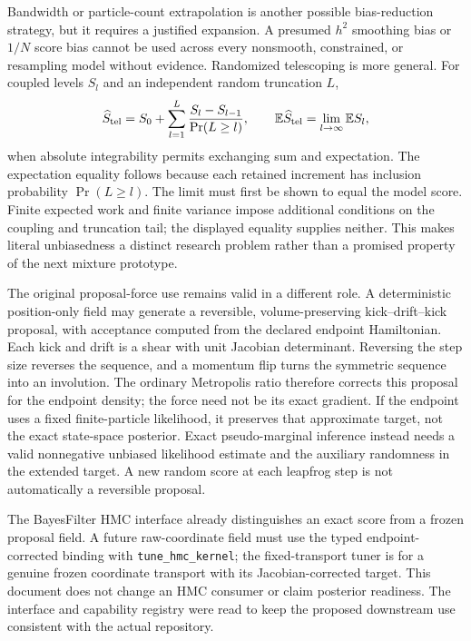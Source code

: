\documentclass[11pt]{article}
\begin{document}
Bandwidth or particle-count extrapolation is another possible bias-reduction
strategy, but it requires a justified expansion. A presumed $h^2$ smoothing
bias or $1/N$ score bias cannot be used across every nonsmooth, constrained,
or resampling model without evidence. Randomized telescoping is more general.
For coupled levels $S_l$ and an independent random truncation $L$,
\begin{equation}
 \widehat S_{\rm tel}
 =S_0+\sum_{l=1}^{L}\frac{S_l-S_{l-1}}{\Pr(L\ge l)},
 \qquad
 \mathbb E\widehat S_{\rm tel}=\lim_{l\to\infty}\mathbb E S_l,
 \label{eq:randomized-telescope}
\end{equation}
when absolute integrability permits exchanging sum and expectation. The
expectation equality follows because each retained increment has inclusion
probability $\Pr(L\ge l)$. The limit must first be shown to equal the model
score. Finite expected work and finite variance impose additional conditions
on the coupling and truncation tail; the displayed equality supplies neither.
This makes literal unbiasedness a distinct research problem rather than a
promised property of the next mixture prototype.

The original proposal-force use remains valid in a different role. A
deterministic position-only field may generate a reversible,
volume-preserving kick--drift--kick proposal, with acceptance computed from
the declared endpoint Hamiltonian. Each kick and drift is a shear with unit
Jacobian determinant. Reversing the step size reverses the sequence, and a
momentum flip turns the symmetric sequence into an involution. The ordinary
Metropolis ratio therefore corrects this proposal for the endpoint density;
the force need not be its exact gradient. If the endpoint uses a fixed
finite-particle likelihood, it preserves that approximate target, not the
exact state-space posterior. Exact pseudo-marginal inference instead needs a
valid nonnegative unbiased likelihood estimate and the auxiliary randomness
in the extended target. A new random score at each leapfrog step is not
automatically a reversible proposal.

The BayesFilter HMC interface already distinguishes an exact score from a
frozen proposal field. A future raw-coordinate field must use the typed
endpoint-corrected binding with \texttt{tune\_hmc\_kernel}; the
fixed-transport tuner is for a genuine frozen coordinate transport with its
Jacobian-corrected target. This document does not change an HMC consumer or
claim posterior readiness. The interface and capability registry were read
to keep the proposed downstream use consistent with the actual repository.
\end{document}
